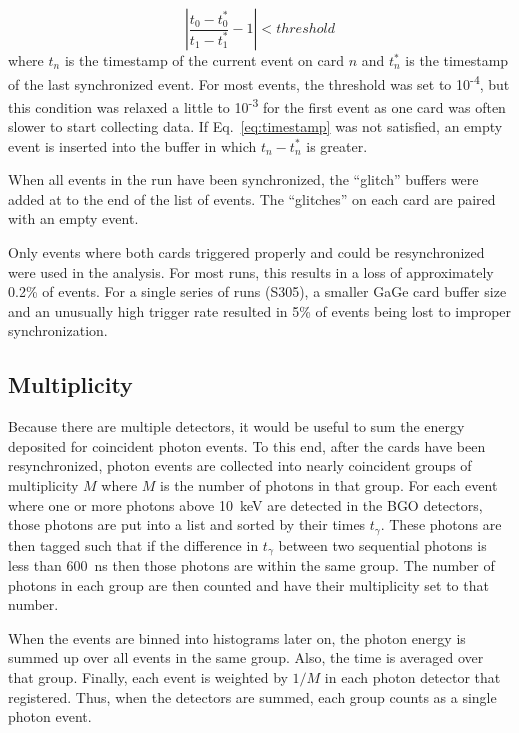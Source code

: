 \documentclass[oneside,12pt]{memoir}
\begin{document}
\begin{equation}
\label{eq:timestamp}
\left|\frac{t_0-t^*_0}{t_1-t^*_1}-1\right|<threshold
\end{equation}
where $t_n$ is the timestamp of the current event on card $n$ and $t^*_n$ is the timestamp of the last synchronized event. For most events, the threshold was set to 10\textsuperscript{-4}, but this condition was relaxed a little to 10\textsuperscript{-3} for the first event as one card was often slower to start collecting data. If Eq.~\ref{eq:timestamp} was not satisfied, an empty event is inserted into the buffer in which $t_n-t^*_n$ is greater.\par
When all events in the run have been synchronized, the ``glitch'' buffers were added at to the end of the list of events. The ``glitches'' on each card are paired with an empty event.\par
Only events where both cards triggered properly and could be resynchronized were used in the analysis. For most runs, this results in a loss of approximately 0.2\% of events. For a single series of runs (S305), a smaller GaGe card buffer size and an unusually high trigger rate resulted in 5\% of events being lost to improper synchronization.
\subsection{Multiplicity}
\label{sec:multiplicity}
Because there are multiple detectors, it would be useful to sum the energy deposited for coincident photon events. To this end, after the cards have been resynchronized, photon events are collected into nearly coincident groups of multiplicity $M$ where $M$ is the number of photons in that group. For each event where one or more photons above 10~keV are detected in the BGO detectors, those photons are put into a list and sorted by their times $t_\gamma$. These photons are then tagged such that if the difference in $t_\gamma$ between two sequential photons is less than 600~ns then those photons are within the same group. The number of photons in each group are then counted and have their multiplicity set to that number.\par
When the events are binned into histograms later on, the photon energy is summed up over all events in the same group. Also, the time is averaged over that group. Finally, each event is weighted by $1/M$ in each photon detector that registered. Thus, when the detectors are summed, each group counts as a single photon event.
\end{document}
